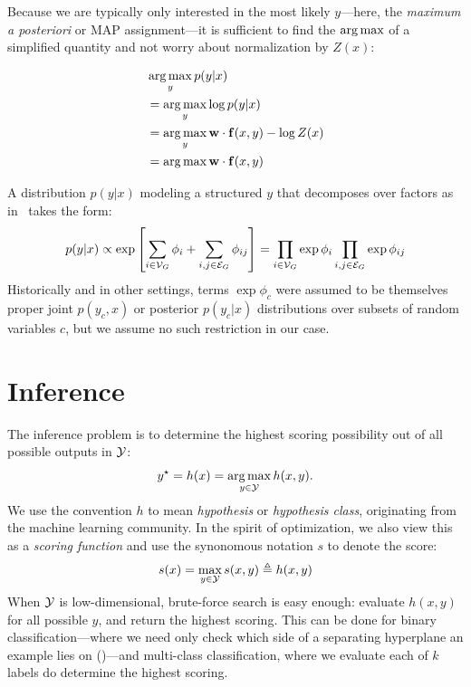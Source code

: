 Because we are typically only interested in the most likely $y$---here, the 
{\em maximum a posteriori} or MAP assignment---it is sufficient to find the 
$\mathop{\arg\max}$ of a simplified quantity and not worry about normalization by $Z(x)$:

\begin{align}
&\mathop{\arg\max}_y p(y|x) \\
&= \mathop{\arg\max}_y \log p(y|x) \\
&= \mathop{\arg\max}_y \mathbf{w} \cdot \mathbf{f}(x,y) - \log Z(x) \\
&= \mathop{\arg\max} \mathbf{w} \cdot \mathbf{f}(x,y)
\end{align}

A distribution $p(y|x)$ modeling a structured $y$ that decomposes over factors 
as in~ takes the form:
\begin{equation}
p(y|x) \propto\exp\left[  \sum_{i \in \mathcal{V}_G} \phi_i + \sum_{i,j \in \mathcal{E}_G}  
\phi_{ij}\right] = \prod_{i \in \mathcal{V}_G} \exp \phi_i  \prod_{i,j \in \mathcal{E}_G} \exp 
\phi_{ij}
\end{equation}
Historically and in other settings, terms $\exp \phi_c$ were assumed to be 
themselves proper joint $p(y_c,x)$ or posterior $p(y_c|x)$ distributions over 
subsets of random variables $c$, but we assume no such restriction in our case.

\section{Inference}
\label{sec:inference}
The inference problem is to determine the highest scoring possibility out of 
all possible outputs in $\mathcal{Y}$: 
\begin{equation} 
y^\star = h(x) = \mathop{\arg\max}_{y \in \mathcal{Y}} h(x,y).  
\end{equation}
We use the convention $h$ to mean {\em hypothesis} or {\em hypothesis class}, originating from the machine learning community.  In the spirit of optimization, we also view this as a {\em scoring function} and use the synonomous notation $s$ to denote the score:
\begin{equation} 
s(x) = \max_{y \in \mathcal{Y}} s(x,y) \triangleq h(x,y)
\end{equation}
When $\mathcal{Y}$ is low-dimensional, brute-force search is easy enough: evaluate 
$h(x,y)$ for all possible $y$, and return the highest scoring.  This can be 
done for binary classification---where we need only check which side of a 
separating hyperplane an example lies on ()---and 
multi-class classification, where we evaluate each of $k$ labels do determine 
the highest scoring.


